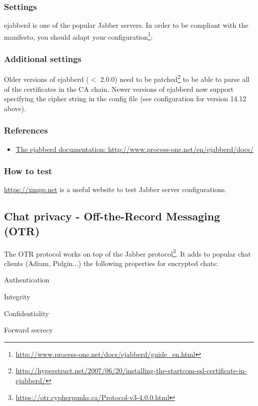 \subsubsection{Settings}
ejabberd is one of the popular Jabber servers. In order to be compliant
with the manifesto, you should adapt your configuration\footnote{\url{http://www.process-one.net/docs/ejabberd/guide_en.html}}:
%
\subsubsection{Additional settings}
Older versions of ejabberd ($ < $ 2.0.0) need to be patched\footnote{\url{http://hyperstruct.net/2007/06/20/installing-the-startcom-ssl-certificate-in-ejabberd/}} to be able to parse all of the certificates in the CA chain.
Newer versions of ejabberd now support specifying the cipher string in the config file (see configuration for version 14.12 above).

\subsubsection{References}

\begin{itemize}
\item \href{http://www.process-one.net/en/ejabberd/docs/}{The ejabberd documentation: http://www.process-one.net/en/ejabberd/docs/}
\end{itemize}


\subsubsection{How to test}
\begin{itemize*}
  \item \url{https://xmpp.net} is a useful website to test Jabber server configurations.
\end{itemize*}


\subsection{Chat privacy - Off-the-Record Messaging (OTR)}

The OTR protocol works on top of the Jabber protocol\footnote{\url{https://otr.cypherpunks.ca/Protocol-v3-4.0.0.html}}.  
It adds to popular chat clients (Adium, Pidgin...) the following properties for encrypted chats:
\begin{itemize*}
  \item Authentication
  \item Integrity
  \item Confidentiality
  \item Forward secrecy
\end{itemize*}

